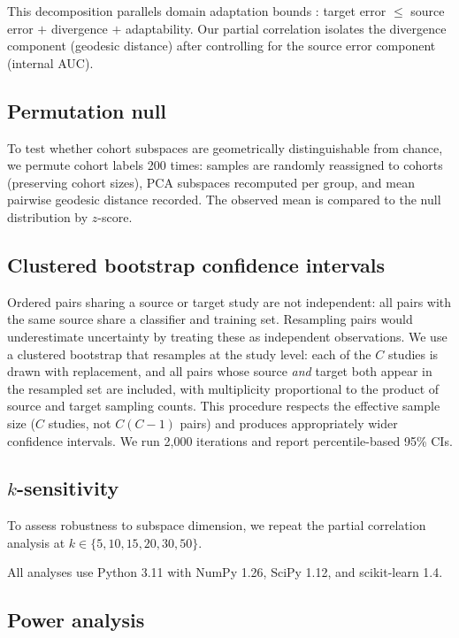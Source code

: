 \documentclass[11pt]{article}
\begin{document}
This decomposition parallels domain adaptation bounds \citep{bendavid2010theory, mansour2009domain}: target error $\leq$ source error $+$ divergence $+$ adaptability. Our partial correlation isolates the divergence component (geodesic distance) after controlling for the source error component (internal AUC).

\subsection{Permutation null}

To test whether cohort subspaces are geometrically distinguishable from chance, we permute cohort labels 200 times: samples are randomly reassigned to cohorts (preserving cohort sizes), PCA subspaces recomputed per group, and mean pairwise geodesic distance recorded. The observed mean is compared to the null distribution by $z$-score.

\subsection{Clustered bootstrap confidence intervals}

Ordered pairs sharing a source or target study are not independent: all pairs with the same source share a classifier and training set. Resampling pairs would underestimate uncertainty by treating these as independent observations. We use a clustered bootstrap that resamples at the study level: each of the $C$ studies is drawn with replacement, and all pairs whose source \emph{and} target both appear in the resampled set are included, with multiplicity proportional to the product of source and target sampling counts. This procedure respects the effective sample size ($C$ studies, not $C(C-1)$ pairs) and produces appropriately wider confidence intervals. We run 2{,}000 iterations and report percentile-based 95\% CIs.

\subsection{$k$-sensitivity}

To assess robustness to subspace dimension, we repeat the partial correlation analysis at $k \in \{5, 10, 15, 20, 30, 50\}$.

All analyses use Python 3.11 with NumPy 1.26, SciPy 1.12, and scikit-learn 1.4.

\subsection{Power analysis}
\label{sec:power}
\end{document}
